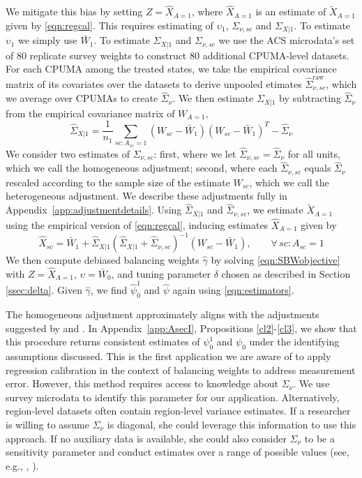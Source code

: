 \documentclass[aoas]{imsart}
\theoremstyle{plain}
\theoremstyle{remark}
\begin{document}
We mitigate this bias by setting $Z = \hat{X}_{A=1}$, where $\hat{X}_{A=1}$ is an estimate of $\tilde{X}_{A=1}$ given by \eqref{eqn:regcal}. This requires estimating of $\upsilon_1$, $\Sigma_{\nu, sc}$ and $\Sigma_{X|1}$. To estimate $\upsilon_1$ we simply use $\bar{W}_1$. To estimate $\Sigma_{X|1}$ and $\Sigma_{\nu,sc}$ we use the ACS microdata's set of 80 replicate survey weights to construct 80 additional CPUMA-level datasets. For each CPUMA among the treated states, we take the empirical covariance matrix of its covariates over the datasets to derive unpooled etimates $\hat{\Sigma}_{\nu,sc}^{\text{raw}}$, which we average over CPUMAs to create $\hat{\Sigma}_{\nu}$. We then estimate $\Sigma_{X|1}$ by subtracting $\hat{\Sigma}_{\nu}$ from the empirical covariance matrix of $W_{A=1}$,
\[ \hat{\Sigma}_{X|1} = \frac{1}{n_1} \sum_{sc:A_{sc}=1} (W_{sc} - \bar{W}_1)(W_{sc} - \bar{W}_1)^T - \hat{\Sigma}_{\nu}\]
We consider two estimates of $\Sigma_{\nu, sc}$: first, where we let $\hat{\Sigma}_{\nu,sc} = \hat{\Sigma}_{\nu}$ for all units, which we call the homogeneous adjustment; second, where each $\hat{\Sigma}_{\nu, sc}$ equals $\hat{\Sigma}_{\nu}$ rescaled according to the sample size of the estimate $W_{sc}$, which we call the heterogeneous adjustment. We describe these adjustments fully in Appendix~\ref{app:adjustmentdetails}. Using $\hat{\Sigma}_{X|1}$ and $\hat{\Sigma}_{\nu, sc}$, we estimate $\tilde{X}_{A=1}$ using the empirical version of \eqref{eqn:regcal}, inducing estimates $\hat{X}_{A=1}$ given by
\begin{equation}\label{eqn:hatX}
\hat{X}_{sc} = \bar{W}_1 + \hat{\Sigma}_{X|1} (\hat{\Sigma}_{X|1} + \hat{\Sigma}_{\nu,sc})^{-1}  (W_{sc} - \bar{W}_1), \qquad \forall\, sc: A_{sc}=1
\end{equation}
We then compute debiased balancing weights $\hat{\gamma}$ by solving \eqref{eqn:SBWobjective} with $Z = \hat{X}_{A=1}$, $\upsilon = \bar{W}_0$, and tuning parameter $\delta$ chosen as described in Section \ref{ssec:delta}. Given $\hat{\gamma}$, we find $\hat{\psi}_0^1$ and $\hat{\psi}$ again using \eqref{eqn:estimators}.

The homogeneous adjustment approximately aligns with the adjustments suggested by \cite{carroll2006measurement} and \cite{gleser1992importance}. In Appendix~\ref{app:AsecI}, Propositions \ref{cl2}-\ref{cl3}, we show that this procedure returns consistent estimates of $\psi_0^1$ and $\psi_0$ under the identifying assumptions discussed. This is the first application we are aware of to apply regression calibration in the context of balancing weights to address measurement error. However, this method requires access to knowledge about $\Sigma_{\nu}$. We use survey microdata to identify this parameter for our application. Alternatively, region-level datasets often contain region-level variance estimates. If a researcher is willing to assume $\Sigma_{\nu}$ is diagonal, she could leverage this information to use this approach. If no auxiliary data is available, she could also consider $\Sigma_{\nu}$ to be a sensitivity parameter and conduct estimates over a range of possible values (see, e.g., \cite{illenberger2020impact}, \cite{huque2014impact}). 
\end{document}
